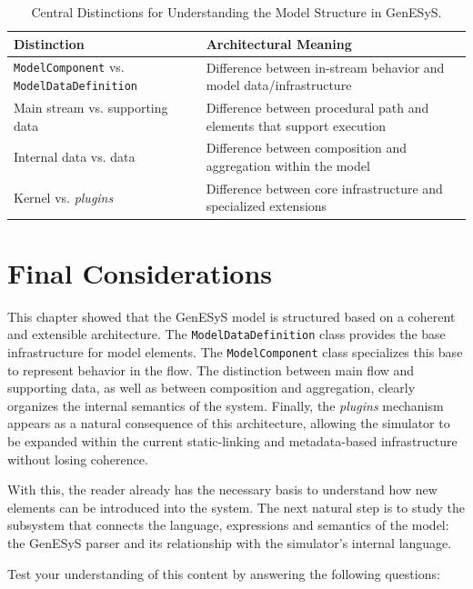 \begin{table}[htbp]
 \centering
 \caption{Central Distinctions for Understanding the Model Structure in GenESyS.}
 \label{tab:cap8_distincoes_centrais}
 \small
 \begin{tabular}{|p{3.8cm}|p{7.4cm}|}
 \hline
 \textbf{Distinction} & \textbf{Architectural Meaning} \\
 \hline
 \texttt{ModelComponent} vs. \texttt{ModelDataDefinition} & Difference between in-stream behavior and model data/infrastructure \\
 \hline
 Main stream vs. supporting data & Difference between procedural path and elements that support execution \\
 \hline
 Internal data vs. data & Difference between composition and aggregation within the model \\
 \hline
 Kernel vs. \textit{plugins} & Difference between core infrastructure and specialized extensions \\
 \hline
 \end{tabular}
\end{table}

\section{Final Considerations}
\label{sec:cap8_consideracoes_finais}

This chapter showed that the GenESyS model is structured based on a coherent and extensible architecture. The \texttt{ModelDataDefinition} class provides the base infrastructure for model elements. The \texttt{ModelComponent} class specializes this base to represent behavior in the flow. The distinction between main flow and supporting data, as well as between composition and aggregation, clearly organizes the internal semantics of the system. Finally, the \textit{plugins} mechanism appears as a natural consequence of this architecture, allowing the simulator to be expanded within the current static-linking and metadata-based infrastructure without losing coherence.

With this, the reader already has the necessary basis to understand how new elements can be introduced into the system. The next natural step is to study the subsystem that connects the language, expressions and semantics of the model: the GenESyS parser and its relationship with the simulator's internal language.

Test your understanding of this content by answering the following questions:

